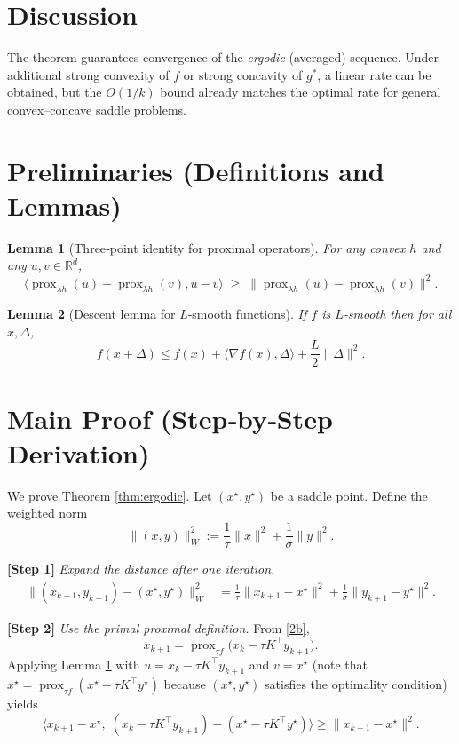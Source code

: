 \documentclass{article}
\newtheorem{lemma}{Lemma}
\newcommand{\prox}{\operatorname{prox}}
\begin{document}
\section*{Discussion}
The theorem guarantees convergence of the \emph{ergodic} (averaged) sequence. Under additional strong convexity of $f$ or strong concavity of $g^{*}$, a linear rate can be obtained, but the $O(1/k)$ bound already matches the optimal rate for general convex–concave saddle problems.

\newpage
\section*{Preliminaries (Definitions and Lemmas)}
\begin{lemma}[Three‑point identity for proximal operators]\label{lem:prox}
For any convex $h$ and any $u,v\in\mathbb{R}^{d}$,
\[
\langle \prox_{\lambda h}(u)-\prox_{\lambda h}(v),u-v\rangle
\;\ge\;
\| \prox_{\lambda h}(u)-\prox_{\lambda h}(v)\|^{2}.
\tag{6}
\]
\end{lemma}
\begin{lemma}[Descent lemma for $L$‑smooth functions]\label{lem:descent}
If $f$ is $L$‑smooth then for all $x,\Delta$,
\[
f(x+\Delta)\le f(x)+\langle\nabla f(x),\Delta\rangle+\frac{L}{2}\|\Delta\|^{2}. \tag{7}
\]
\end{lemma}

\section*{Main Proof (Step‑by‑Step Derivation)}
We prove Theorem \ref{thm:ergodic}. Let $(x^{\star},y^{\star})$ be a saddle point. Define the weighted norm
\[
\|(x,y)\|_{W}^{2}:=\frac{1}{\tau}\|x\|^{2}+\frac{1}{\sigma}\|y\|^{2}.
\tag{8}
\]

\noindent\textbf{[Step 1]} \emph{Expand the distance after one iteration.}
\[
\begin{aligned}
\|(x_{k+1},y_{k+1})-(x^{\star},y^{\star})\|_{W}^{2}
&=\frac{1}{\tau}\|x_{k+1}-x^{\star}\|^{2}
   +\frac{1}{\sigma}\|y_{k+1}-y^{\star}\|^{2}.
\end{aligned}
\tag{9}
\]

\noindent\textbf{[Step 2]} \emph{Use the primal proximal definition.}
From \eqref{2b},
\[
x_{k+1}= \prox_{\tau f}\!\bigl(x_{k}-\tau K^{\!\top}y_{k+1}\bigr).
\]
Applying Lemma \ref{lem:prox} with $u=x_{k}-\tau K^{\!\top}y_{k+1}$ and $v=x^{\star}$ (note that $x^{\star}= \prox_{\tau f}(x^{\star}-\tau K^{\!\top}y^{\star})$ because $(x^{\star},y^{\star})$ satisfies the optimality condition) yields
\[
\langle x_{k+1}-x^{\star},\; (x_{k}-\tau K^{\!\top}y_{k+1})-(x^{\star}-\tau K^{\!\top}y^{\star})\rangle
\ge \|x_{k+1}-x^{\star}\|^{2}.
\tag{10}
\]
\end{document}
